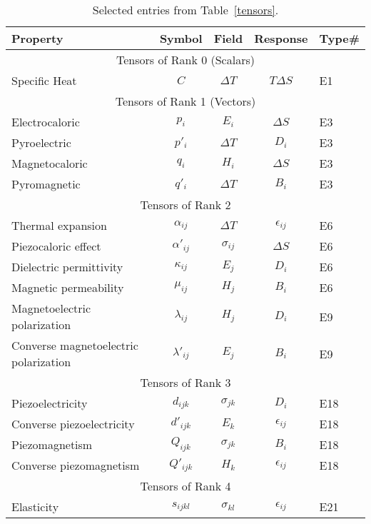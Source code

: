 \begin{table}[h]
\centering\leavevmode
\begin{tabular}{|l|c|c|c|l|}
\hline
Property   &  Symbol   &  Field & Response & Type\#  \\
\hline
\hline
\multicolumn{5}{|c|}{Tensors of Rank 0 (Scalars)}\\
\hline
Specific Heat   &   $C$   & $\Delta T$ & $T\Delta S$ &   E1\\
\hline
\multicolumn{5}{|c|}{Tensors of Rank 1 (Vectors)}\\
\hline
Electrocaloric  &  $p_i$  & $E_i$ & $\Delta S$ & E3\\
Pyroelectric  &  $p'_i$  & $\Delta T$ & $D_i$ & E3\\
Magnetocaloric & $q_i$  &  $H_i$ & $\Delta S$ & E3\\
Pyromagnetic & $q'_i$  &  $\Delta T$ & $B_i$ & E3\\
\hline
\multicolumn{5}{|c|}{Tensors of Rank 2}\\
\hline
Thermal expansion  & $\alpha_{ij}$  & $\Delta T$ & $\epsilon_{ij}$ & E6\\
Piezocaloric effect  & $\alpha'_{ij}$  & $\sigma_{ij}$ & $\Delta S$ & E6\\
Dielectric permittivity & $\kappa_{ij}$  & $E_j$ & $D_i$ &  E6\\
Magnetic permeability & $\mu_{ij}$ & $H_j$ & $B_i$ & E6\\
Magnetoelectric polarization & $\lambda_{ij}$ & $H_j$ & $D_i$  & E9\\
Converse magnetoelectric polarization & $\lambda'_{ij}$ & $E_j$ & $B_i$  & E9\\
\hline
\multicolumn{5}{|c|}{Tensors of Rank 3}\\
\hline
Piezoelectricity  &  $d_{ijk}$  & $\sigma_{jk}$ & $D_i$ &  E18\\
Converse piezoelectricity  &  $d'_{ijk}$  & $E_k$ & $\epsilon_{ij}$ &  E18\\
Piezomagnetism &  $Q_{ijk}$  & $\sigma_{jk}$ & $B_i$ & E18\\
Converse piezomagnetism &  $Q'_{ijk}$  & $H_{k}$ & $\epsilon_{ij}$ & E18\\
\hline
\multicolumn{5}{|c|}{Tensors of Rank 4}\\
\hline
Elasticity  &  $s_{ijkl}$  & $\sigma_{kl}$ & $\epsilon_{ij}$  & E21\\
\hline
\end{tabular}
\caption{Selected entries from Table~\ref{tensors}.}
\label{tb:small}
\end{table}

